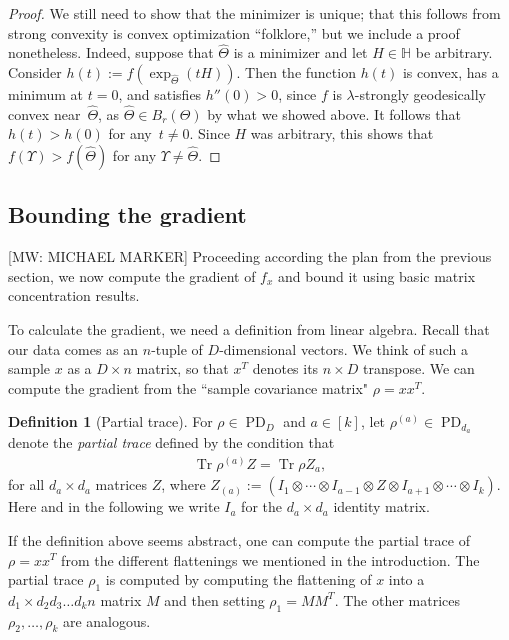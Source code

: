 \documentclass[aos]{imsart}
\theoremstyle{definition}
\newtheorem{definition}[theorem]{Definition}
\numberwithin{equation}{section}
\DeclareMathOperator{\tr}{Tr}
\DeclareMathOperator{\PD}{PD}
\renewcommand{\H}{{\mathbb{H}}}
\newcommand{\htheta}{\widehat{\Theta}}
\newcommand{\ot}{\otimes}
\newcommand{\samp}{x}
\newcommand{\rv}{X}
\newcommand{\MW}[1]{{\color{red}[MW: #1]}}
\begin{document}
\begin{proof}
We still need to show that the minimizer is unique; that this follows from strong convexity is convex optimization ``folklore,'' but we include a proof nonetheless.
Indeed, suppose that $\htheta$ is a minimizer and let $H\in \H$ be arbitrary.
Consider $h(t) := f(\exp_{\htheta}(tH))$.
Then the function $h(t)$ is convex, has a minimum at $t=0$, and satisfies $h''(0) > 0$, since $f$ is $\lambda$-strongly geodesically convex near~$\htheta$, as $\htheta \in B_r(\Theta)$ by what we showed above.
It follows that $h(t) > h(0)$ for any~$t\neq0$.
Since $H$ was arbitrary, this shows that $f(\Upsilon) > f(\htheta)$ for any $\Upsilon\neq \htheta$.
\end{proof}

\subsection{Bounding the gradient}
\MW{MICHAEL MARKER}
Proceeding according the plan from the previous section, we now compute the gradient of $f_{\samp}$ and bound it using basic matrix concentration results.

To calculate the gradient, we need a definition from linear algebra. Recall that our data comes as an $n$-tuple of $D$-dimensional vectors. We think of such a sample $\samp$ as a $D \times n$ matrix, so that $\samp^T$ denotes its $n \times D$ transpose. We can compute the gradient from the ``sample covariance matrix" $\rho = \samp \samp^T$.

\begin{definition}[Partial trace]\label{def:single marginal}
For $\rho \in \PD_D$ and $a\in[k]$, let $\rho^{(a)} \in \PD_{d_a}$ denote the \emph{partial trace} defined by the condition that
\begin{align*}
  \tr \rho^{(a)} Z = \tr \rho Z_a,
\end{align*}
for all $d_a \times d_a$ matrices $Z$, where $Z_{(a)} := (I_1 \ot \cdots \ot I_{a-1} \ot Z \ot I_{a+1} \ot \cdots \ot I_k)$.
Here and in the following we write $I_a$ for the $d_a\times d_a$ identity matrix. 
\end{definition}

If the definition above seems abstract, one can compute the partial trace of $\rho = \samp \samp^T$ from the different flattenings we mentioned in the introduction. The partial trace $\rho_1$ is computed by computing the flattening of $\samp$ into a $d_1\times d_2 d_3 \dots d_k n$ matrix $M$ and then setting $\rho_1 = M M^T$. The other matrices $\rho_2, \dots, \rho_k$ are analogous.
\end{document}
